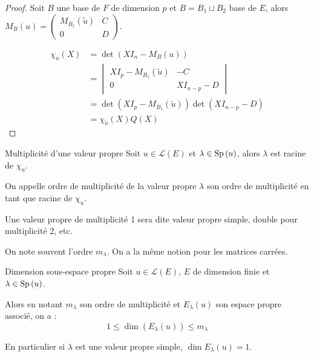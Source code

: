 
\begin{proof}
    Soit $B$ une base de $F$ de dimension $p$ et $B = B_1 \sqcup B_2$ base de $E$, alors 
    $M_B(u) = \begin{pmatrix}
        M_{B_1}(\tilde u) & C \\
        0 & D
    \end{pmatrix}$.

    \begin{align}
        \chi_u(X) & = \det(X I_n - M_B(u)) \\
                    & = \begin{vmatrix}
                        X I_p - M_{B_1}(\tilde u) & -C \\
                        0 & X I_{n - p} - D
                    \end{vmatrix} \\
                    & = \det(X I_p - M_{B_1}(\tilde u)) \det(X I_{n - p} - D) \\
                    & = \chi_{\tilde u}(X) Q (X)
    \end{align}
\end{proof}

\begin{definition}{Multiplicité d'une valeur propre}{}
    Soit $u \in \mathscr L(E)$ et $\lambda \in \operatorname{Sp} \,(u)$,
    alors $\lambda $ est racine de $\chi_u$.

    On appelle ordre de multiplicité de la valeur propre $\lambda$ son ordre de multiplicité en tant que racine de $\chi_u$.
\end{definition}

\begin{exemple}
    Une valeur propre de multiplicité 1 sera dite valeur propre simple, double pour multiplicité 2, etc.

    On note souvent l'ordre $m_\lambda$. On a la même notion pour les matrices carrées. 
\end{exemple}

\begin{proposition}{Dimension sous-espace propre}{}
    Soit $u \in \mathscr L(E), \, E$ de dimension finie et $\lambda \in \operatorname{Sp} \,(u)$. 

    Alors en notant $m_\lambda$ son ordre de multiplicité et $E_\lambda(u)$ son espace propre associé, on a :
    $$1 \leqslant \dim(E_\lambda(u)) \leqslant m_\lambda$$

    En particulier si $\lambda$ est une valeur propre simple, $\dim E_\lambda (u) = 1$.
\end{proposition}


